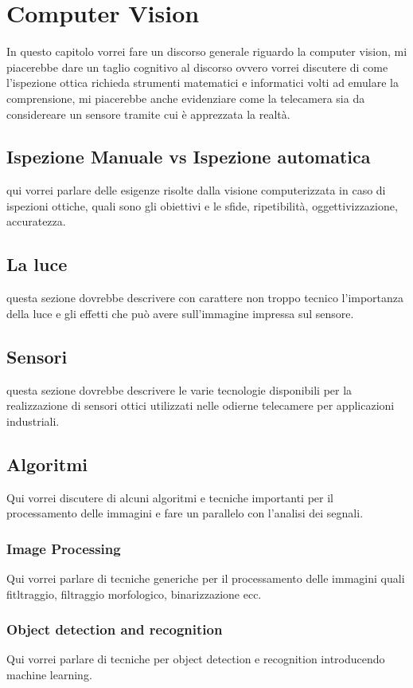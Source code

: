 \chapter{Computer Vision}

In questo capitolo vorrei fare un discorso generale riguardo la computer vision,
mi piacerebbe dare un taglio cognitivo al discorso ovvero vorrei discutere di come
l'ispezione ottica richieda strumenti matematici e informatici volti ad emulare
la comprensione, mi piacerebbe anche evidenziare come la telecamera sia da considereare
un sensore tramite cui è apprezzata la realtà.

\section{Ispezione Manuale vs Ispezione automatica}

qui vorrei parlare delle esigenze risolte dalla visione computerizzata in caso di
ispezioni ottiche, quali sono gli obiettivi e le sfide, ripetibilità, oggettivizzazione,
accuratezza.

\section{La luce}

questa sezione dovrebbe descrivere con carattere non troppo tecnico l'importanza della luce
e gli effetti che può avere sull'immagine impressa sul sensore.

\section{Sensori}

questa sezione dovrebbe descrivere le varie tecnologie disponibili per la realizzazione di
sensori ottici utilizzati nelle odierne telecamere per applicazioni industriali.

\section{Algoritmi}
Qui vorrei discutere di alcuni algoritmi e tecniche importanti per il processamento delle immagini
e fare un parallelo con l'analisi dei segnali.

\subsection{Image Processing}
Qui vorrei parlare di tecniche generiche per il processamento delle immagini quali fitltraggio, filtraggio
morfologico, binarizzazione ecc.

\subsection{Object detection and recognition}	
Qui vorrei parlare di tecniche per object detection e recognition introducendo machine learning.

\endinput